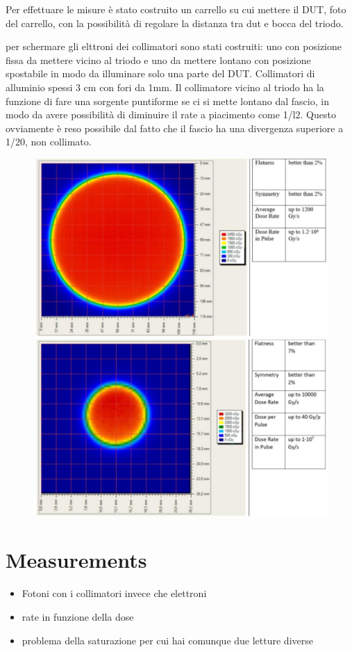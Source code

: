    Per effettuare le misure è stato costruito un carrello su cui mettere il DUT, foto del carrello, con la possibilità di regolare la distanza tra dut e bocca del triodo. 

   per schermare gli elttroni dei collimatori sono stati costruiti: uno con posizione fissa da mettere vicino al triodo e uno da mettere lontano con posizione spostabile in modo da illuminare solo una parte del DUT. 
   Collimatori di alluminio spessi 3 cm con fori da 1mm. Il collimatore vicino al triodo ha la funzione di fare una sorgente puntiforme se ci si mette lontano dal fascio, in modo da avere possibilità di diminuire il rate a piacimento come 1/l2.
   Questo ovviamente è reso possibile dal fatto che il fascio ha una divergenza superiore a 1/20, non collimato. 
   \begin{figure}[h!]
      \centering
      \includegraphics[width=.49\linewidth]{figures/test_beam/dose_profile_10cm.pdf}
      \includegraphics[width=.49\linewidth]{figures/test_beam/dose_profile_1cm.pdf}
      \caption{}
      \label{fig:dose_profile}
   \end{figure}     


\section{Measurements}

   \begin{itemize}
      \item Fotoni con i collimatori invece che elettroni
      \item rate in funzione della dose
      \item problema della saturazione per cui hai comunque due letture diverse 
   \end{itemize} 





